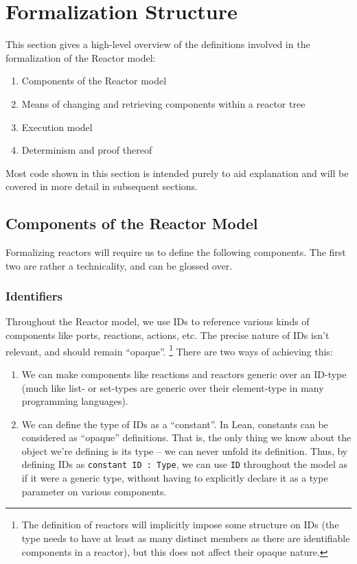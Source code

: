 \section{Formalization Structure}

This section gives a high-level overview of the definitions involved in the formalization of the Reactor model:

\begin{enumerate}
    \item Components of the Reactor model
    \item Means of changing and retrieving components within a reactor tree
    \item Execution model
    \item Determinism and proof thereof
\end{enumerate}

Most code shown in this section is intended purely to aid explanation and will be covered in more detail in subsequent sections.

\subsection{Components of the Reactor Model}

Formalizing reactors will require us to define the following components.
The first two are rather a technicality, and can be glossed over.

\subsubsection{Identifiers}

Throughout the Reactor model, we use IDs to reference various kinds of components like ports, reactions, actions, etc.
The precise nature of IDs isn't relevant, and should remain ``opaque''. \footnote{The definition of reactors will implicitly impose some structure on IDs (the type needs to have at least as many distinct members as there are identifiable components in a reactor), but this does not affect their opaque nature.}
There are two ways of achieving this:

\begin{enumerate}
    \item We can make components like reactions and reactors generic over an ID-type (much like list- or set-types are generic over their element-type in many programming languages).
    \item We can define the type of IDs as a ``constant''.
        In Lean, constants can be considered as ``opaque'' definitions. 
        That is, the only thing we know about the object we're defining is its type -- we can never unfold its definition.
        Thus, by defining IDs as \lstinline{constant ID : Type}, we can use \lstinline{ID} throughout the model as if it were a generic type, without having to explicitly declare it as a type parameter on various components.
\end{enumerate}

